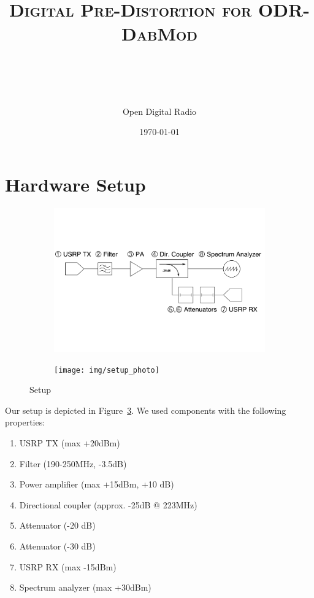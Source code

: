 \documentclass[paper=a4, fontsize=11pt]{scrartcl} %
\title{
\normalfont \normalsize
\textsc{Digital Pre-Distortion for ODR-DabMod} \\ [25pt] %
\horrule{0.5pt} \\[0.4cm] %
\horrule{2pt} \\[0.5cm] %
}
\author{Open Digital Radio} %
\date{\normalsize\today} %
\numberwithin{equation}{section} %
\numberwithin{figure}{section} %
\numberwithin{table}{section} %
\begin{document}
\maketitle %

\section{Hardware Setup}

\begin{figure}
    \begin{subfigure}[c]{0.5\textwidth}
      \center
      \includegraphics[width=\textwidth]{img/setup_diagram}
      \label{fig:setup_diagram}
  \end{subfigure}%
  \begin{subfigure}[c]{0.5\textwidth}
      \center
      \texttt{[image: img/setup\_photo]}
      \label{fig:setup_photo}
  \end{subfigure}
\caption{Setup}
\label{fig:setup}
\end{figure}

Our setup is depicted in Figure~\ref{fig:setup}. We used components with the following properties:
\begin{enumerate}
    \item USRP TX (max +20dBm)
    \item Filter (190-250MHz, -3.5dB)
    \item Power amplifier (max +15dBm, +10 dB)
    \item Directional coupler (approx. -25dB @ 223MHz)
    \item Attenuator (-20 dB)
    \item Attenuator (-30 dB)
    \item USRP RX (max -15dBm)
    \item Spectrum analyzer (max +30dBm)
\end{enumerate}
\end{document}

